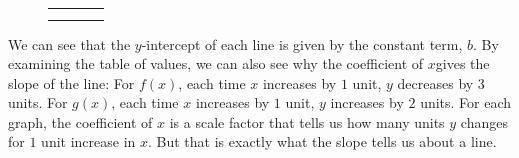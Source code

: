\documentclass[10pt,]{book}
\theoremstyle{plain}
\theoremstyle{definition}
\theoremstyle{definition}
\theoremstyle{definition}
\theoremstyle{definition}
\numberwithin{equation}{part}
\newlength{\panelmax}
\begin{document}
{{}
\newlength{\phGCimage}\setlength{\phGCimage}{\ht\panelboxGCimage+\dp\panelboxGCimage}
\settototalheight{\phGCimage}{\usebox{\panelboxGCimage}}
\setlength{\panelmax}{\maxof{\panelmax}{\phGCimage}}
\leavevmode%
\setlength{\tabcolsep}{0\textwidth}
\begin{figure}
\begin{tabular}{@{}*{4}{c}@{}}
\begin{minipage}[c][\panelmax][t]{0.25\textwidth}\usebox{\panelboxCJtabular}\end{minipage}&
\begin{minipage}[c][\panelmax][t]{0.25\textwidth}\usebox{\panelboxGBimage}\end{minipage}&
\begin{minipage}[c][\panelmax][t]{0.25\textwidth}\usebox{\panelboxCKtabular}\end{minipage}&
\begin{minipage}[c][\panelmax][t]{0.25\textwidth}\usebox{\panelboxGCimage}\end{minipage}\tabularnewline
\parbox[t]{0.25\textwidth}{
}&
\parbox[t]{0.25\textwidth}{
}&
\parbox[t]{0.25\textwidth}{
}&
\parbox[t]{0.25\textwidth}{
}\end{tabular}
\end{figure}
}%
We can see that the \(y\)-intercept of each line is given by the constant term, \(b\). By examining the table of values, we can also see why the coefficient of \(x\)gives the slope of the line: For \(f (x)\), each time \(x\) increases by \(1\) unit, \(y\) decreases by \(3\) units. For \(g(x)\), each time \(x\) increases by \(1\) unit, \(y\) increases by \(2\) units. For each graph, the coefficient of \(x\) is a scale factor that tells us how many units \(y\) changes for \(1\) unit increase in \(x\). But that is exactly what the slope tells us about a line.%
\end{document}
